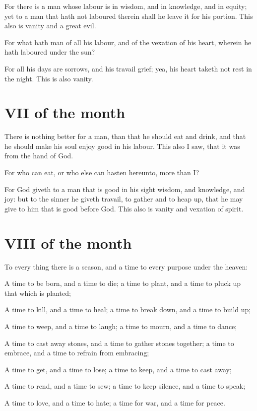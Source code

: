 For there is a man whose labour is in wisdom, and in knowledge, and in equity; yet to a man that hath not laboured therein shall he leave it for his portion. This also is vanity and a great evil.

For what hath man of all his labour, and of the vexation of his heart, wherein he hath laboured under the sun?

For all his days are sorrows, and his travail grief; yea, his heart taketh not rest in the night. This is also vanity.

\section{VII of the month}

There is nothing better for a man, than that he should eat and drink, and that he should make his soul enjoy good in his labour. This also I saw, that it was from the hand of God.

For who can eat, or who else can hasten hereunto, more than I?

For God giveth to a man that is good in his sight wisdom, and knowledge, and joy: but to the sinner he giveth travail, to gather and to heap up, that he may give to him that is good before God. This also is vanity and vexation of spirit.

\section{VIII of the month}

To every thing there is a season, and a time to every purpose under the heaven:

A time to be born, and a time to die; a time to plant, and a time to pluck up that which is planted;

A time to kill, and a time to heal; a time to break down, and a time to build up;

A time to weep, and a time to laugh; a time to mourn, and a time to dance;

A time to cast away stones, and a time to gather stones together; a time to embrace, and a time to refrain from embracing;

A time to get, and a time to lose; a time to keep, and a time to cast away;

A time to rend, and a time to sew; a time to keep silence, and a time to speak;

\verseamended A time to love, and a time to hate; a time for war, and a time for peace.

